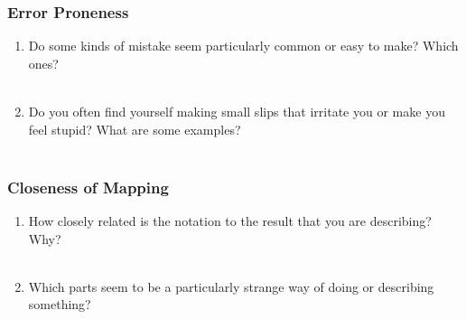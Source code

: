 \documentclass[14pt]{article}
\newcommand{\answerbox}{
\fbox{
\begin{minipage}{16cm}
\hfill\vspace{2cm}
\end{minipage}
}\\
}
\begin{document}
%

%

\subsubsection{Error Proneness}

\begin{enumerate}
\item Do some kinds of mistake seem particularly common or easy to make? Which ones?\\
\answerbox
\item Do you often find yourself making small slips that irritate you or make you feel stupid? What are some examples?\\
\answerbox
\end{enumerate}

\subsubsection{Closeness of Mapping}

\begin{enumerate}
\item How closely related is the notation to the result that you are describing? Why?\\ %
\answerbox

\pagebreak

\item Which parts seem to be a particularly strange way of doing or describing something?\\
\answerbox
\end{enumerate}
\end{document}
